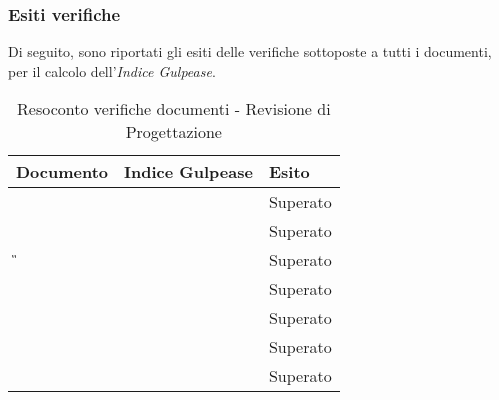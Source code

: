 	\subsubsection{Esiti verifiche}
	Di seguito, sono riportati gli esiti delle verifiche sottoposte a tutti i documenti, per il calcolo dell’\textit{Indice Gulpease}.


	\begin{table}[H]
		\begin{longtable}{>{\centering\arraybackslash}p{5cm}|>{\centering\arraybackslash}p{5cm} | >{\centering\arraybackslash}p{5cm}}
			\hline
			\rowcolor{Gray}
			\textbf{Documento} & \textbf{Indice Gulpease} & \textbf{Esito} \\
			\hline
			\textit{\ST} & & Superato \\
			\hline
			\textit{\AdR} & & Superato\\
			\hline
			\textit{\G} & & Superato \\
			\hline
			\textit{\NdP} & & Superato \\
			\hline
			\textit{\PdP}& & Superato\\
			\hline
			\textit{\PdQ} & & Superato\\
			\hline
			\textit{\SdF} & & Superato\\
		\end{longtable}
		\caption{Resoconto verifiche documenti - Revisione di Progettazione}
	\end{table}